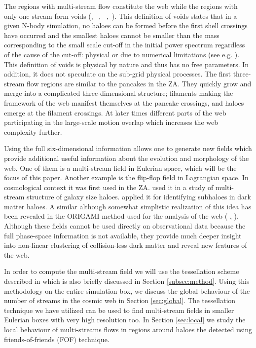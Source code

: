 The regions with multi-stream flow constitute the web while the regions with only one stream form
voids (\citealt{Shandarin2011}, ~\citealt{Shandarin2012}, ~\citealt{Abel2012},~\citealt{Falck2012}).
This definition of voids states that in a given N-body simulation, no haloes can be formed before the first
shell crossings have occurred and the smallest haloes cannot be smaller than the mass corresponding 
to the small scale cut-off in the initial power spectrum regardless of the cause of the cut-off:  physical or due to numerical
limitations (see e.g. \citealt{Angulo2013}).  This definition of voids is physical by nature and thus has no  free parameters. In addition, it does not speculate on the sub-grid physical processes.
The first three-stream flow regions are similar to the pancakes in the ZA.
They quickly grow and merge into a complicated three-dimensional structure; filaments making the framework of the web manifest 
themselves at the pancake crossings,  and haloes emerge at the filament crossings. At later times  different parts of the web participating
in the large-scale motion overlap  which increases the web complexity further.

Using the full six-dimensional information allows one to generate new fields which  provide 
additional useful information about the evolution and morphology of the  web. 
One of them is a multi-stream field in Eulerian space, which will be the focus of this paper. 
Another example is the flip-flop field in Lagrangian space. In cosmological context it was first used in the ZA.
\citet{Vogelsberger2011} used it in a study of multi-stream structure of galaxy size haloes.
\citet{Shandarin2014} applied it for identifying subhaloes  in dark matter haloes.
A similar although somewhat simplistic realization of this idea has been revealed in the ORIGAMI method
used for the analysis of the web ( \citealt{Falck2012},  \citealt{Falck2015} ).
 Although these fields cannot be used directly on observational data because the full phase-space information
 is not available, they provide much deeper insight into non-linear clustering of collision-less dark matter
and reveal new features of the web.


In order to compute the multi-stream field we will use the tessellation scheme described in
 \citet{Shandarin2012} which is  also briefly discussed in Section \ref{subsec:method}.
  Using this methodology on the entire simulation box, we discuss the global behaviour of the number of streams in the cosmic web in Section \ref{sec:global}. 
  The tessellation technique we have utilized can be used to find multi-stream fields in smaller Eulerian boxes with very high resolution too. In Section \ref{sec:local} we study the local behaviour of multi-streams flows in regions around haloes the detected using friends-of-friends (FOF) technique.
 
